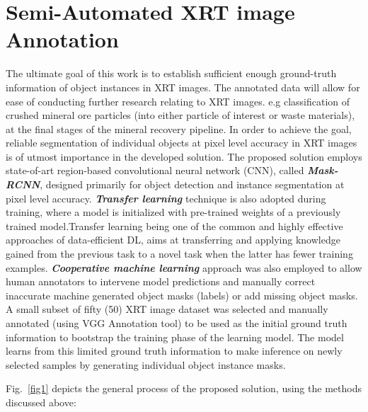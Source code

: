\documentclass[conference]{IEEEtran}
\begin{document}
	

\section{Semi-Automated XRT image Annotation}
	
		The ultimate goal of this work is to establish sufficient enough ground-truth
information of object instances in XRT images. The annotated data will allow for ease of
conducting further research relating to XRT images. e.g classification of crushed mineral
ore particles (into either particle of interest or waste materials), at the final stages of the mineral
recovery pipeline. In order to achieve the goal, reliable segmentation of individual objects at pixel level accuracy in XRT images is of utmost importance in the developed solution.
The proposed solution employs state-of-art region-based convolutional neural network
(CNN), called \textbf{\textit{Mask-RCNN}}, designed primarily for object detection and instance segmentation at pixel level accuracy. \textbf{\textit{Transfer learning}} technique is also adopted during training, where a model is initialized with pre-trained weights of a previously trained model.Transfer learning being one of the common and highly effective approaches of data-efficient DL, aims at transferring and applying knowledge gained from the previous task to a novel task when the latter has fewer training examples. \textit{\textbf{Cooperative machine learning}} approach was also employed to allow human annotators to intervene model predictions and manually correct inaccurate machine generated object masks (labels) or add missing object masks.\\
		
		
		A small subset of fifty (50) XRT image dataset was selected and manually annotated (using VGG Annotation tool) to be used as the initial ground truth information to bootstrap the training phase of the learning model. The model learns from this limited ground truth information to make inference on newly selected samples by generating individual object instance masks. 
			
		
		Fig.~\ref{fig1} depicts the general process of the proposed solution, using the methods discussed above:\\
\end{document}

